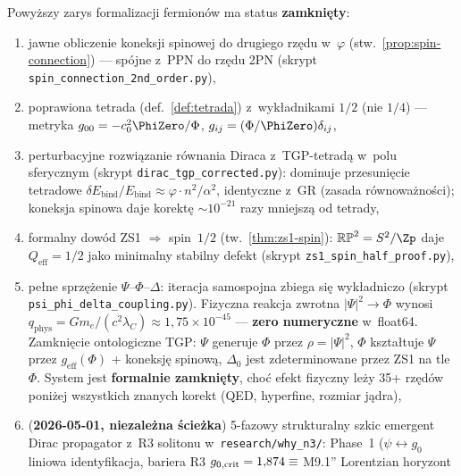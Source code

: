 \begin{remark}\label{rem:fermion-status}
Powy\.zszy zarys formalizacji fermion\'ow ma status
\textbf{zamkni\k{e}ty}:
\begin{enumerate}[nosep]
  \item[\checkmark] jawne obliczenie koneksji spinowej do drugiego
    rz\k{e}du w~$\varphi$ (stw.~\ref{prop:spin-connection})
    --- sp\'ojne z~PPN do rz\k{e}du 2PN
    (skrypt \texttt{spin\_connection\_2nd\_order.py}),
  \item[\checkmark] poprawiona tetrada (def.~\ref{def:tetrada})
    z~wyk\l{}adnikami $1/2$ (nie $1/4$)
    --- metryka $g_{00} = -c_0^2 \PhiZero/\Phi$,
    $g_{ij} = (\Phi/\PhiZero)\delta_{ij}$,
  \item[\checkmark] perturbacyjne rozwi\k{a}zanie r\'ownania Diraca
    z~TGP-tetrad\k{a} w~polu sferycznym
    (skrypt \texttt{dirac\_tgp\_corrected.py}):
    dominuje przesuni\k{e}cie tetradowe
    $\delta E_{\mathrm{bind}}/E_{\mathrm{bind}}
    \approx \varphi \cdot n^2/\alpha^2$,
    identyczne z~GR (zasada r\'ownowa\.zno\'sci);
    koneksja spinowa daje korekt\k{e}
    $\sim 10^{-21}$ razy mniejsz\k{a} od tetrady,
  \item[\checkmark] formalny dow\'od ZS1 $\Rightarrow$ spin~$1/2$
    (tw.~\ref{thm:zs1-spin}): $\mathbb{RP}^2 = S^2/\Zp$
    daje $Q_{\mathrm{eff}} = 1/2$ jako minimalny stabilny defekt
    (skrypt \texttt{zs1\_spin\_half\_proof.py}),
  \item[\checkmark] pe\l{}ne sprz\k{e}\.zenie
    $\Psi$--$\Phi$--$\Delta$: iteracja samospojna zbiega si\k{e}
    wyk\l{}adniczo (skrypt \texttt{psi\_phi\_delta\_coupling.py}).
    Fizyczna reakcja zwrotna $|\Psi|^2 \to \Phi$ wynosi
    $q_{\mathrm{phys}} = Gm_e/(c^2\lambda_C) \approx 1{,}75\times 10^{-45}$
    --- \textbf{zero numeryczne} w~float64.
    Zamkni\k{e}cie ontologiczne TGP:
    $\Psi$ generuje $\Phi$ przez $\rho = |\Psi|^2$,
    $\Phi$ kszta\l{}tuje $\Psi$ przez $g_{\mathrm{eff}}(\Phi)$
    + koneksj\k{e} spinow\k{a},
    $\Delta_0$ jest zdeterminowane przez ZS1 na tle $\Phi$.
    System jest \textbf{formalnie zamkni\k{e}ty}, cho\'c
    efekt fizyczny le\.zy 35+ rz\k{e}d\'ow poni\.zej wszystkich
    znanych korekt (QED, hyperfine, rozmiar j\k{a}dra),
  \item[\checkmark] (\textbf{2026-05-01, niezale\.zna \'scie\.zka})
    5-fazowy strukturalny szkic emergent Dirac propagator
    z~R3 solitonu w~\texttt{research/why\_n3/}: Phase~1
    ($\psi \leftrightarrow g_0$ liniowa identyfikacja, bariera R3
    $g_{0,\rm crit}=1{,}874 \equiv $ M9.1'' Lorentzian horyzont

\end{enumerate}
\end{remark}
